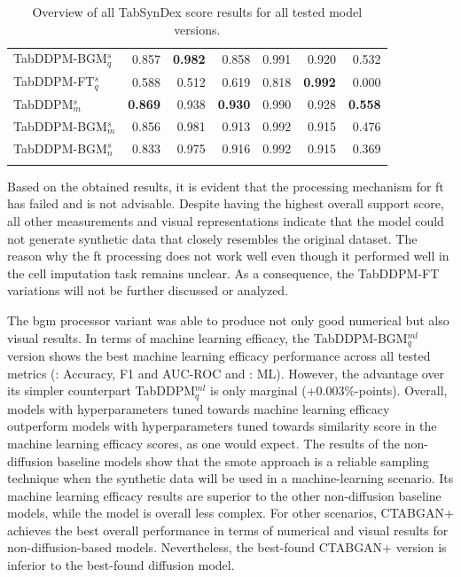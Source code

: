 \begin{table}[h]
\begin{tabular}{lrrrrrr}
		TabDDPM-BGM$^{s}_q$   & 0.857                     & \textbf{0.982} & 0.858                & 0.991          & 0.920            & 0.532          \\
		TabDDPM-FT$^{s}_q$    & 0.588                     & 0.512          & 0.619                & 0.818          & \textbf{0.992}   & 0.000          \\
		TabDDPM$^{s}_m$       & \textbf{0.869}            & 0.938          & \textbf{0.930}       & 0.990          & 0.928            & \textbf{0.558} \\
		TabDDPM-BGM$^{s}_m$   & 0.856                     & 0.981          & 0.913                & 0.992          & 0.915            & 0.476          \\
		TabDDPM-BGM$^{s}_{n}$ & 0.833                     & 0.975          & 0.916                & 0.992          & 0.915            & 0.369          \\
		\bottomrule
		\multicolumn{7}{c}{}\\[-0.6em]
	\end{tabular}
	\caption[Overview all TabSynDex results]{Overview of all TabSynDex score results for all tested model versions.}
	\label{tab:sim-all}
\end{table}


Based on the obtained results, it is evident that the processing mechanism for \gls{ft} has failed and is not advisable.
Despite having the highest overall support score, all other measurements and visual representations indicate that the \gls{model} could not generate synthetic data that closely resembles the original dataset.
The reason why the \gls{ft} processing does not work well even though it performed well in the cell imputation task \cite{zheng2022DiffusionModelsMissing} remains unclear.
As a consequence, the TabDDPM-FT variations will not be further discussed or analyzed.

The \gls{bgm} processor variant was able to produce not only good numerical but also visual results.
In terms of machine learning efficacy, the TabDDPM-BGM$^{ml}_q$ version shows the best machine learning efficacy performance across all tested metrics (: Accuracy, F1 and AUC-ROC and : ML).
However, the advantage over its simpler counterpart TabDDPM$^{ml}_q$ is only marginal (+0.003\%-points).
Overall, models with hyperparameters tuned towards machine learning efficacy outperform models with hyperparameters tuned towards similarity score in the machine learning efficacy scores, as one would expect.
The results of the non-diffusion baseline models show that the \gls{smote} approach is a reliable sampling technique when the synthetic data will be used in a machine-learning scenario.
Its machine learning efficacy results are superior to the other non-diffusion baseline models, while the \gls{model} is overall less complex.
For other scenarios, CTABGAN+ achieves the best overall performance in terms of numerical and visual results for non-diffusion-based models.
Nevertheless, the best-found CTABGAN+ version is inferior to the best-found diffusion \gls{model}.


